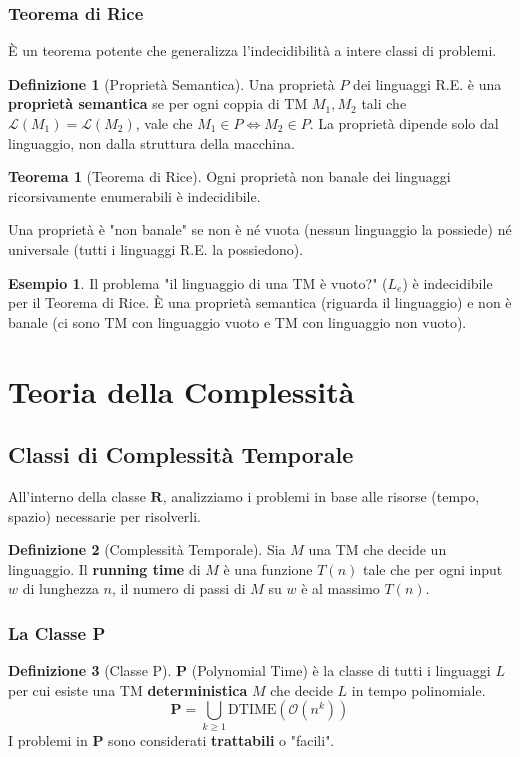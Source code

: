 \documentclass[a4paper]{article}
\theoremstyle{definition} %
\newtheorem{theorem}{Teorema}
\newtheorem{definition}{Definizione}
\newtheorem{example}{Esempio}
\newcommand{\lang}[1]{\mathcal{L}(#1)}
\newcommand{\bigO}[1]{\mathcal{O}(#1)}
\begin{document}
\subsubsection{Teorema di Rice}
È un teorema potente che generalizza l'indecidibilità a intere classi di problemi.
\begin{definition}[Proprietà Semantica]
Una proprietà $P$ dei linguaggi R.E. è una \textbf{proprietà semantica} se per ogni coppia di TM $M_1, M_2$ tali che $\lang{M_1} = \lang{M_2}$, vale che $M_1 \in P \iff M_2 \in P$. La proprietà dipende solo dal linguaggio, non dalla struttura della macchina.
\end{definition}
\begin{theorem}[Teorema di Rice]
Ogni proprietà non banale dei linguaggi ricorsivamente enumerabili è indecidibile.
\end{theorem}
Una proprietà è "non banale" se non è né vuota (nessun linguaggio la possiede) né universale (tutti i linguaggi R.E. la possiedono).
\begin{example}
Il problema "il linguaggio di una TM è vuoto?" ($L_e$) è indecidibile per il Teorema di Rice. È una proprietà semantica (riguarda il linguaggio) e non è banale (ci sono TM con linguaggio vuoto e TM con linguaggio non vuoto).
\end{example}

\section{Teoria della Complessità}

\subsection{Classi di Complessità Temporale}
All'interno della classe $\mathbf{R}$, analizziamo i problemi in base alle risorse (tempo, spazio) necessarie per risolverli.
\begin{definition}[Complessità Temporale]
Sia $M$ una TM che decide un linguaggio. Il \textbf{running time} di $M$ è una funzione $T(n)$ tale che per ogni input $w$ di lunghezza $n$, il numero di passi di $M$ su $w$ è al massimo $T(n)$.
\end{definition}

\subsubsection{La Classe P}
\begin{definition}[Classe P]
$\mathbf{P}$ (Polynomial Time) è la classe di tutti i linguaggi $L$ per cui esiste una TM \textbf{deterministica} $M$ che decide $L$ in tempo polinomiale.
$$ \mathbf{P} = \bigcup_{k \ge 1} \text{DTIME}(\bigO{n^k}) $$
I problemi in $\mathbf{P}$ sono considerati \textbf{trattabili} o "facili".
\end{definition}
\end{document}

